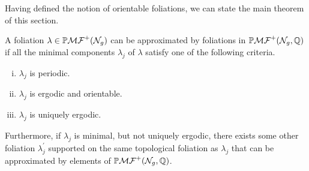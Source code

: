 Having defined the notion of orientable foliations, we can state the main theorem of this section.
\begin{theorem}
  \label{thm:rational-approximation}
  A foliation $\lambda \in \mathbb{P}\mathcal{MF}^+(\mathcal{N}_g)$ can be approximated by foliations in $\mathbb{P}\mathcal{MF}^+(\mathcal{N}_g, \mathbb{Q})$ if all the minimal components $\lambda_j$ of $\lambda$ satisfy one of the following criteria.
  \begin{enumerate}[(i)]
  \item $\lambda_j$ is periodic.
  \item $\lambda_j$ is ergodic and orientable.
  \item $\lambda_j$ is uniquely ergodic.
  \end{enumerate}
  Furthermore, if $\lambda_j$ is minimal, but not uniquely ergodic, there exists some other foliation $\lambda_j^{\prime}$ supported on the same topological foliation as $\lambda_j$ that can be approximated by elements of $\mathbb{P}\mathcal{MF}^+(\mathcal{N}_g, \mathbb{Q})$.
\end{theorem}

